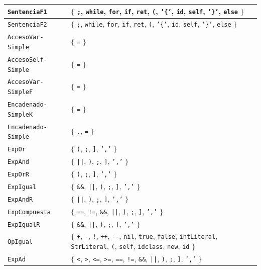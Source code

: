 \begin{longtable}{|
>{\raggedright\arraybackslash}p{}|
>{\raggedright\arraybackslash}p{}|}
\texttt{SentenciaF1} & \(\{\) \texttt{;}, \texttt{while}, \texttt{for}, \texttt{if}, \texttt{ret}, \texttt{(}, \texttt{'\{'}, \texttt{id}, \texttt{self}, \texttt{'\}'}, \texttt{else} \(\}\) \\ \hline
\texttt{SentenciaF2} & \(\{\) \texttt{;}, \texttt{while}, \texttt{for}, \texttt{if}, \texttt{ret}, \texttt{(}, \texttt{'\{'}, \texttt{id}, \texttt{self}, \texttt{'\}'}, \texttt{else} \(\}\) \\ \hline
\texttt{AccesoVar-Simple} & \(\{\) \texttt{=} \(\}\) \\ \hline
\texttt{AccesoSelf-Simple} & \(\{\) \texttt{=} \(\}\) \\ \hline
\texttt{AccesoVar-SimpleF} & \(\{\) \texttt{=} \(\}\) \\ \hline
\texttt{Encadenado-SimpleK} & \(\{\) \texttt{=} \(\}\) \\ \hline
\texttt{Encadenado-Simple} & \(\{\) \texttt{.}, \texttt{=} \(\}\) \\ \hline
\texttt{ExpOr} & \(\{\) \texttt{)}, \texttt{;}, \texttt{]}, \texttt{','} \(\}\) \\ \hline
\texttt{ExpAnd} & \(\{\) \texttt{||}, \texttt{)}, \texttt{;}, \texttt{]}, \texttt{','} \(\}\) \\ \hline
\texttt{ExpOrR} & \(\{\) \texttt{)}, \texttt{;}, \texttt{]}, \texttt{','} \(\}\) \\ \hline
\texttt{ExpIgual} & \(\{\) \texttt{\&\&}, \texttt{||}, \texttt{)}, \texttt{;}, \texttt{]}, \texttt{','} \(\}\) \\ \hline
\texttt{ExpAndR} & \(\{\) \texttt{||}, \texttt{)}, \texttt{;}, \texttt{]}, \texttt{','} \(\}\) \\ \hline
\texttt{ExpCompuesta} & \(\{\) \texttt{==}, \texttt{!=}, \texttt{\&\&}, \texttt{||}, \texttt{)}, \texttt{;}, \texttt{]}, \texttt{','} \(\}\) \\ \hline
\texttt{ExpIgualR} & \(\{\) \texttt{\&\&}, \texttt{||}, \texttt{)}, \texttt{;}, \texttt{]}, \texttt{','} \(\}\) \\ \hline
\texttt{OpIgual} & \(\{\) \texttt{+}, \texttt{-}, \texttt{!}, \texttt{++}, \texttt{-{}-}, \texttt{nil}, \texttt{true}, \texttt{false}, \texttt{intLiteral}, \texttt{StrLiteral}, \texttt{(}, \texttt{self}, \texttt{idclass}, \texttt{new}, \texttt{id} \(\}\) \\ \hline
\texttt{ExpAd} & \(\{\) \texttt{<}, \texttt{>}, \texttt{<=}, \texttt{>=}, \texttt{==}, \texttt{!=}, \texttt{\&\&}, \texttt{||}, \texttt{)}, \texttt{;}, \texttt{]}, \texttt{','} \(\}\) \\ \hline

\end{longtable}
